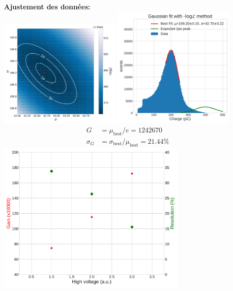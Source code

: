 {\begin{additional}
\textbf{Ajustement des donn{\'e}es:}\\
\includegraphics[width=0.45\textwidth]{exampleAnalysis/plots/Likelihood_Data_electron_VME.pdf}\hfill
\includegraphics[width=0.45\textwidth]{exampleAnalysis/plots/LLH_Fit_electron_VME.pdf}
\begin{align*}
G &= \mu_{\text{best}}/e = 1242670 \\
\sigma_G &= \sigma_{\text{best}} / \mu_{\text{best}} = 21.44\%
\end{align*}
{\centering
\includegraphics[width=0.7\textwidth]{exampleAnalysis/plots/Electron_Gain_Resolution_HV_VME.pdf}\\}
\end{additional}
}

\pagebreak

